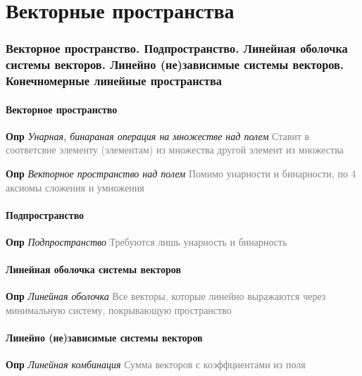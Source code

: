 \documentclass[a4paper, 14pt]{article}
\begin{document}
    \tableofcontents \newpage

     \part*{Векторные пространства}

    \section{Векторное пространство.
    Подпространство.
    Линейная оболочка системы векторов.
    Линейно (не)зависимые системы векторов.
    Конечномерные линейные пространства}

    \subsection{Векторное пространство}

    \textbf{Опр} \textit{Унарная, бинараная операция на множестве над полем} \textcolor{gray}{Ставит в соответсвие
    элементу (элементам) из множества другой элемент из множества}

    \textbf{Опр} \textit{Векторное пространство над полем} \textcolor{gray}{Помимо унарности и бинарности, по 4 аксиомы
    сложения и умножения}

    \subsection{Подпространство}

    \textbf{Опр} \textit{Подпространство} \textcolor{gray}{Требуются лишь унарность и бинарность}

    \subsection{Линейная оболочка системы векторов}

    \textbf{Опр} \textit{Линейная оболочка} \textcolor{gray}{Все векторы, которые линейно выражаются через минимальную
    систему, покрывающую пространство}

    \subsection{Линейно (не)зависимые системы векторов}

    \textbf{Опр} \textit{Линейная комбинация}
    \textcolor{gray}{Сумма векторов с коэффциентами из поля}
\end{document}
